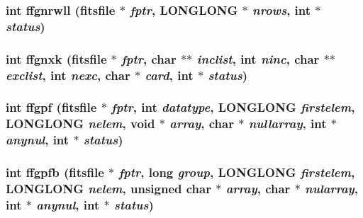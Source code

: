 \subsubsection{\setlength{\rightskip}{0pt plus 5cm}int ffgnrwll (\bf{fitsfile} $\ast$ {\em fptr}, \bf{LONGLONG} $\ast$ {\em nrows}, int $\ast$ {\em status})}\label{test_2roimasker_2fitsio_8h_de18b919b0b4fec8c16e56126d3fb0a0}


\subsubsection{\setlength{\rightskip}{0pt plus 5cm}int ffgnxk (\bf{fitsfile} $\ast$ {\em fptr}, char $\ast$$\ast$ {\em inclist}, int {\em ninc}, char $\ast$$\ast$ {\em exclist}, int {\em nexc}, char $\ast$ {\em card}, int $\ast$ {\em status})}\label{test_2roimasker_2fitsio_8h_19ff4531fbaa18e5979fb079215ad5ce}


\subsubsection{\setlength{\rightskip}{0pt plus 5cm}int ffgpf (\bf{fitsfile} $\ast$ {\em fptr}, int {\em datatype}, \bf{LONGLONG} {\em firstelem}, \bf{LONGLONG} {\em nelem}, void $\ast$ {\em array}, char $\ast$ {\em nullarray}, int $\ast$ {\em anynul}, int $\ast$ {\em status})}\label{test_2roimasker_2fitsio_8h_fd98f4b7e140059770ec7fa0396a5b46}


\subsubsection{\setlength{\rightskip}{0pt plus 5cm}int ffgpfb (\bf{fitsfile} $\ast$ {\em fptr}, long {\em group}, \bf{LONGLONG} {\em firstelem}, \bf{LONGLONG} {\em nelem}, unsigned char $\ast$ {\em array}, char $\ast$ {\em nularray}, int $\ast$ {\em anynul}, int $\ast$ {\em status})}\label{test_2roimasker_2fitsio_8h_b3ed324412e62cb24a95691ab0ab7bb1}


